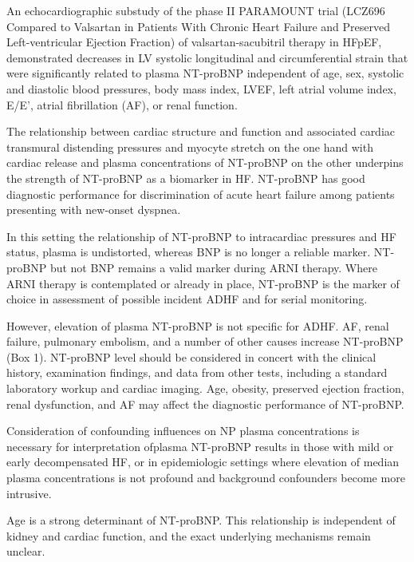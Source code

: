\documentclass[14pt,a4paper,onecolumn]{extarticle}
\begin{document}
An echocardiographic substudy of the phase II PARAMOUNT trial (LCZ696 Compared to Valsartan in Patients With Chronic Heart Failure and Preserved Left-ventricular Ejection Fraction) of valsartan-sacubitril therapy in HFpEF, demonstrated decreases in LV systolic longitudinal and circumferential strain that were significantly related to plasma NT-proBNP independent of age, sex, systolic and diastolic blood pressures, body mass index, LVEF, left atrial volume index, E/E’, atrial fibrillation (AF), or renal function. \citep{Kraigher-Krainer2014} %

The relationship between cardiac structure and function and associated cardiac transmural distending pressures and myocyte stretch on the one hand with cardiac release and plasma concentrations of NT-proBNP on the other underpins the strength of NT-proBNP as a biomarker in HF. NT-proBNP has good diagnostic performance for discrimination of acute heart failure among patients presenting with new-onset dyspnea. \citep{Richards2018} %

In this setting the relationship of NT-proBNP to intracardiac pressures and HF status, plasma is undistorted, whereas BNP is no longer a reliable marker. NT-proBNP but not BNP remains a valid marker during ARNI therapy. Where ARNI therapy is contemplated or already in place, NT-proBNP is the marker of choice in assessment of possible incident ADHF and for serial monitoring. \citep{Richards2018} %

However, elevation of plasma NT-proBNP is not specific for ADHF. AF, renal failure, pulmonary embolism, and a number of other causes increase NT-proBNP (Box 1). NT-proBNP level should be considered in concert with the clinical history, examination findings, and data from other tests, including a standard laboratory workup and cardiac imaging. Age, obesity, preserved ejection fraction, renal dysfunction, and AF may affect the diagnostic performance of NT-proBNP. \citep{Richards2018} %

Consideration of confounding influences on NP plasma concentrations is necessary for interpretation ofplasma NT-proBNP results in those with mild or early decompensated HF, or in epidemiologic settings where elevation of median plasma concentrations is not profound and background confounders become more intrusive. \citep{Richards2018} %

Age is a strong determinant of NT-proBNP. This relationship is independent of kidney and cardiac function, and the exact underlying mechanisms remain unclear.  \citep{Richards2018} %
\end{document}
